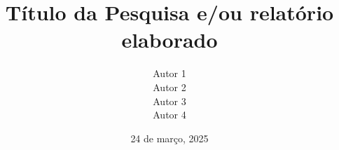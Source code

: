 \documentclass[aspectratio=169]{beamer}
\title{Título da Pesquisa e/ou relatório elaborado}
\author{Autor 1\\
    Autor 2\\
    Autor 3\\
    Autor 4}
\date{24 de março, 2025}
\institute{Nome do centro/núcleo/iniciativa}
\begin{document}
\begin{frame}
  \titlepage
\end{frame}


\end{document}
